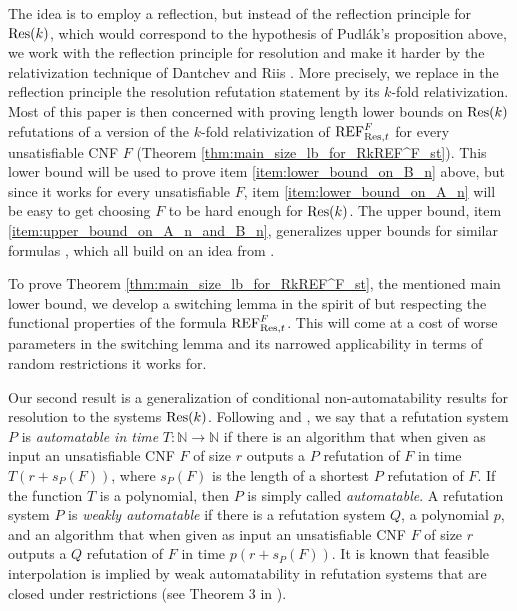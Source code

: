 \documentclass[10pt,a4paper]{article}
\theoremstyle{remark}
\newtheorem*{switching lemma}{Switching Lemma}
\newtheorem*{open problem}{Open Problem}
\theoremstyle{definition}
\begin{document}
The idea is to employ a reflection, but instead of the reflection principle for $\textnormal{Res}(k)$, which would correspond to the hypothesis of Pudl\'ak's proposition above, we work with the reflection principle for resolution and make it harder by the relativization technique of Dantchev and Riis \cite{Dantchev-Riis2003}. More precisely, we replace in the reflection principle the resolution refutation statement by its $k$-fold relativization. Most of this paper is then concerned with proving length lower bounds on $\textnormal{Res}(k)$ refutations of a version of the $k$-fold relativization of $\textnormal{REF}^F_{\textnormal{Res},t}$ for every unsatisfiable CNF $F$ (Theorem \ref{thm:main_size_lb_for_RkREF^F_st}). This lower bound will be used to prove item \ref{item:lower_bound_on_B_n} above, but since it works for every unsatisfiable $F$, item \ref{item:lower_bound_on_A_n} will be easy to get choosing $F$ to be hard enough for $\textnormal{Res}(k)$. The upper bound, item \ref{item:upper_bound_on_A_n_and_B_n}, generalizes upper bounds for similar formulas \cite{Atserias-Bonet2004, atserias-muller2019-focs, Garlik2019-mfcs}, which all build on an idea from \cite{Pudlak2003}.

To prove Theorem \ref{thm:main_size_lb_for_RkREF^F_st}, the mentioned main lower bound, we develop a switching lemma in the spirit of \cite{segerlind-buss-impagliazzo} but respecting the functional properties of the formula $\textnormal{REF}^F_{\textnormal{Res},t}$. This will come at a cost of worse parameters in the switching lemma and its narrowed applicability in terms of random restrictions it works for.

Our second result is a generalization of conditional non-automatability results for resolution \cite{atserias-muller2019-focs} to the systems $\textnormal{Res}(k)$. Following \cite{Bonet-Pitassi-Raz,Atserias-Bonet2004} and \cite{atserias-muller2019-focs}, we say that a refutation system $P$ is \emph{automatable in time} $T: \mathbb{N} \rightarrow \mathbb{N}$ if there is an algorithm that when given as input an unsatisfiable CNF $F$ of size $r$ outputs a $P$ refutation of $F$ in time $T(r + s_P(F))$, where $s_P(F)$ is the length of a shortest $P$ refutation of $F$. If the function $T$ is a polynomial, then $P$ is simply called \emph{automatable}. A refutation system $P$ is \emph{weakly automatable} if there is a refutation system $Q$, a polynomial $p$, and an algorithm that when given as input an unsatisfiable CNF $F$ of size $r$ outputs a $Q$ refutation of $F$ in time $p(r+s_P(F))$. It is known that feasible interpolation is implied by weak automatability in refutation systems that are closed under restrictions (see Theorem 3 in \cite{Atserias-Bonet2004}).
\end{document}

